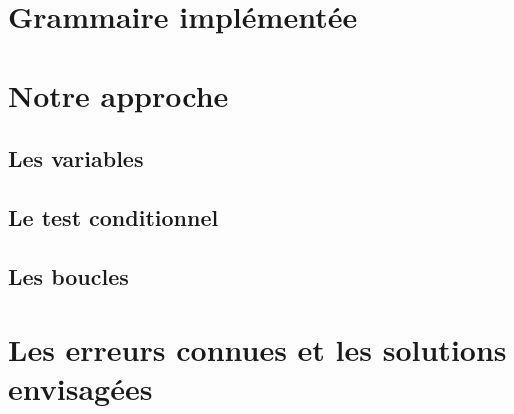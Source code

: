 \section{Grammaire implémentée}

\section{Notre approche}
\subsection{Les variables}

\subsection{Le test conditionnel}

\subsection{Les boucles}

\section{Les erreurs connues et les solutions envisagées}
